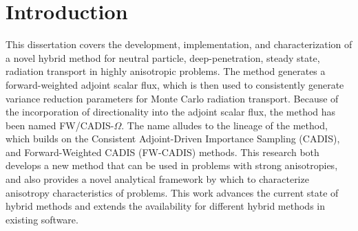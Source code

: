 \chapter{Introduction}
\label{ch:introduction}

This dissertation covers the development,
implementation, and characterization
of a novel hybrid method for neutral particle, deep-penetration, steady state, radiation transport in
highly anisotropic problems. The method generates a forward-weighted adjoint
scalar flux, which is then used to consistently generate variance reduction
parameters for Monte Carlo radiation transport. Because of the incorporation
of directionality into the adjoint scalar flux,
the method has been named FW/CADIS-$\Omega$. The name alludes to the lineage of
the method, which builds on
the Consistent Adjoint-Driven Importance Sampling (CADIS), and
Forward-Weighted CADIS (FW-CADIS) methods. %
This research both develops a new method that can be used in problems with
strong anisotropies, and also provides a novel
analytical framework by which to characterize anisotropy characteristics of problems. This
work advances the current state of hybrid methods and extends the availability
for different hybrid methods in existing software.




% 



